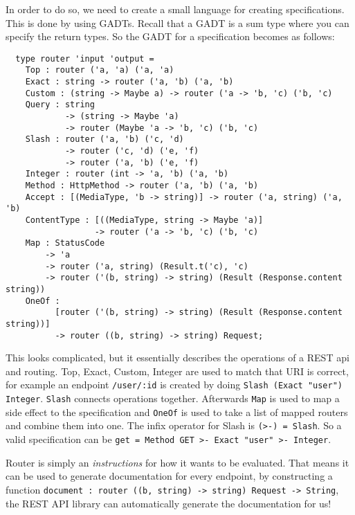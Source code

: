 In order to do so, we need to create a small language for creating
specifications. This is done by using GADTs. Recall that a GADT is a sum type
where you can specify the return types. So the GADT for a specification becomes
as follows:

\begin{lstlisting}
  type router 'input 'output =
    Top : router ('a, 'a) ('a, 'a)
    Exact : string -> router ('a, 'b) ('a, 'b)
    Custom : (string -> Maybe a) -> router ('a -> 'b, 'c) ('b, 'c)
    Query : string 
            -> (string -> Maybe 'a) 
            -> router (Maybe 'a -> 'b, 'c) ('b, 'c)
    Slash : router ('a, 'b) ('c, 'd) 
            -> router ('c, 'd) ('e, 'f) 
            -> router ('a, 'b) ('e, 'f) 
    Integer : router (int -> 'a, 'b) ('a, 'b)
    Method : HttpMethod -> router ('a, 'b) ('a, 'b)
    Accept : [(MediaType, 'b -> string)] -> router ('a, string) ('a, 'b)
    ContentType : [((MediaType, string -> Maybe 'a)]
                  -> router ('a -> 'b, 'c) ('b, 'c)
    Map : StatusCode 
        -> 'a 
        -> router ('a, string) (Result.t('c), 'c)
        -> router ('(b, string) -> string) (Result (Response.content string))
    OneOf :
          [router ('(b, string) -> string) (Result (Response.content string))]
          -> router ((b, string) -> string) Request;
\end{lstlisting}


This looks complicated, but it essentially describes the operations of a REST
api and routing. Top, Exact, Custom, Integer are used to match that URI is
correct, for example an endpoint \texttt{/user/:id} is created by doing
\texttt{Slash (Exact "user") Integer}. \texttt{Slash} connects operations
together. Afterwards \texttt{Map} is used to map a side effect to the
specification and \texttt{OneOf} is used to take a list of mapped routers and
combine them into one. The infix operator for Slash is \texttt{(>-) = Slash}. So
a valid specification can be \texttt{get = Method GET >- Exact "user" >-
Integer}.

Router is simply an \textit{instructions} for how it wants to be evaluated. That
means it can be used to generate documentation for every endpoint, by
constructing a function \texttt{document : router ((b, string) -> string)
Request -> String}, the REST API library can automatically generate the
documentation for us!

